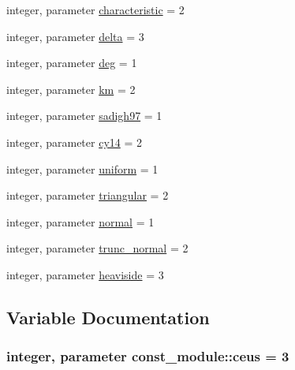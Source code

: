 \begin{DoxyCompactItemize}
\item 
integer, parameter \hyperlink{namespaceconst__module_ab9dc6742ce1e2309dd194ecdd254779d}{characteristic} = 2
\item 
integer, parameter \hyperlink{namespaceconst__module_a6bed9e9fc42a9b205a9214865ad145f5}{delta} = 3
\item 
integer, parameter \hyperlink{namespaceconst__module_ad7dece49d5a2db833c491ea2eed54f52}{deg} = 1
\item 
integer, parameter \hyperlink{namespaceconst__module_a4e8504d7945ca96447c578c95644bd5a}{km} = 2
\item 
integer, parameter \hyperlink{namespaceconst__module_a83696a36c5a2e83e44cbfbbc479717a9}{sadigh97} = 1
\item 
integer, parameter \hyperlink{namespaceconst__module_ac32c40069d129a7d06c22292afaae3ba}{cy14} = 2
\item 
integer, parameter \hyperlink{namespaceconst__module_a91a738fc17a72ffc4e34e5141cccc469}{uniform} = 1
\item 
integer, parameter \hyperlink{namespaceconst__module_a7e2946932c4a8471477923bc49aeafe4}{triangular} = 2
\item 
integer, parameter \hyperlink{namespaceconst__module_a8010dcce5207fede7f1da8dbde0b5be8}{normal} = 1
\item 
integer, parameter \hyperlink{namespaceconst__module_a3895bfacad51cb8237e9cae087b1663a}{trunc\+\_\+normal} = 2
\item 
integer, parameter \hyperlink{namespaceconst__module_a0a0ee9e64316ae52e9c539987c5d18d5}{heaviside} = 3
\end{DoxyCompactItemize}


\subsection{Variable Documentation}
\hypertarget{namespaceconst__module_a6d9b6ff754fe58527edcaea132c3d736}{}
\subsubsection[{ceus}]{\setlength{\rightskip}{0pt plus 5cm}integer, parameter const\+\_\+module\+::ceus = 3}\label{namespaceconst__module_a6d9b6ff754fe58527edcaea132c3d736}
\hypertarget{namespaceconst__module_ab9dc6742ce1e2309dd194ecdd254779d}{}
